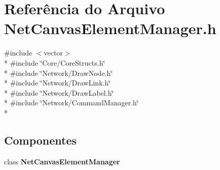 \section{Referência do Arquivo Net\+Canvas\+Element\+Manager.\+h}
\label{_net_canvas_element_manager_8h}
{\ttfamily \#include $<$vector$>$}\\*
{\ttfamily \#include \char`\"{}Core/\+Core\+Structs.\+h\char`\"{}}\\*
{\ttfamily \#include \char`\"{}Network/\+Draw\+Node.\+h\char`\"{}}\\*
{\ttfamily \#include \char`\"{}Network/\+Draw\+Link.\+h\char`\"{}}\\*
{\ttfamily \#include \char`\"{}Network/\+Draw\+Label.\+h\char`\"{}}\\*
{\ttfamily \#include \char`\"{}Network/\+Command\+Manager.\+h\char`\"{}}\\*
\subsection*{Componentes}
\begin{DoxyCompactItemize}
\item 
class {\bf Net\+Canvas\+Element\+Manager}
\end{DoxyCompactItemize}
